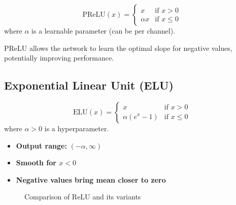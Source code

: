 \begin{equation}
\text{PReLU}(x) = 
\begin{cases}
x & \text{if } x > 0 \\
\alpha x & \text{if } x \leq 0
\end{cases}
\end{equation}
where $\alpha$ is a learnable parameter (can be per channel).

\begin{note}
PReLU allows the network to learn the optimal slope for negative values, potentially improving performance.
\end{note}

\subsection{Exponential Linear Unit (ELU)}

\begin{equation}
\text{ELU}(x) = 
\begin{cases}
x & \text{if } x > 0 \\
\alpha(e^x - 1) & \text{if } x \leq 0
\end{cases}
\end{equation}
where $\alpha > 0$ is a hyperparameter.

\begin{properties}
\begin{itemize}
    \item \textbf{Output range:} $(-\alpha, \infty)$
    \item \textbf{Smooth for $x < 0$}
    \item \textbf{Negative values bring mean closer to zero}
\end{itemize}
\end{properties}

\begin{figure}[h]
    \centering
    \caption[Comparison of ReLU variants]{Comparison of ReLU and its variants}
    \label{fig:relu_variants}
\end{figure}

